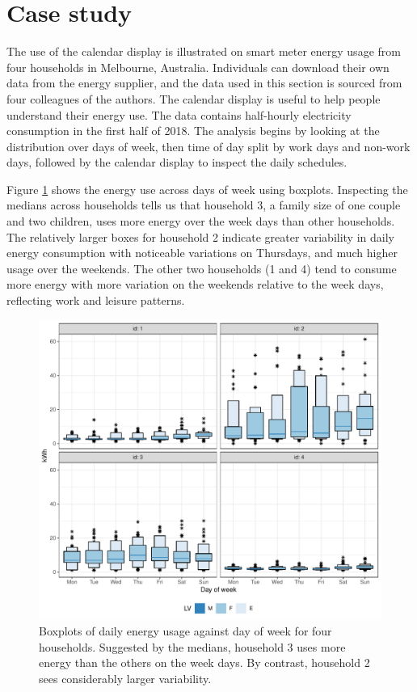 \documentclass[12pt]{article}
\begin{document}
\hypertarget{sec:case}{%
\section{Case study}\label{sec:case}}

The use of the calendar display is illustrated on smart meter energy usage from four households in Melbourne, Australia. Individuals can download their own data from the energy supplier, and the data used in this section is sourced from four colleagues of the authors. The calendar display is useful to help people understand their energy use. The data contains half-hourly electricity consumption in the first half of 2018. The analysis begins by looking at the distribution over days of week, then time of day split by work days and non-work days, followed by the calendar display to inspect the daily schedules.

Figure \ref{fig:dow} shows the energy use across days of week using boxplots. Inspecting the medians across households tells us that household 3, a family size of one couple and two children, uses more energy over the week days than other households. The relatively larger boxes for household 2 indicate greater variability in daily energy consumption with noticeable variations on Thursdays, and much higher usage over the weekends. The other two households (1 and 4) tend to consume more energy with more variation on the weekends relative to the week days, reflecting work and leisure patterns.

\begin{figure}

{\centering \includegraphics[width=\textwidth]{figure/dow-1} 

}

\caption{Boxplots of daily energy usage against day of week for four households. Suggested by the medians, household 3 uses more energy than the others on the week days. By contrast, household 2 sees considerably larger variability.}\label{fig:dow}
\end{figure}
\end{document}
